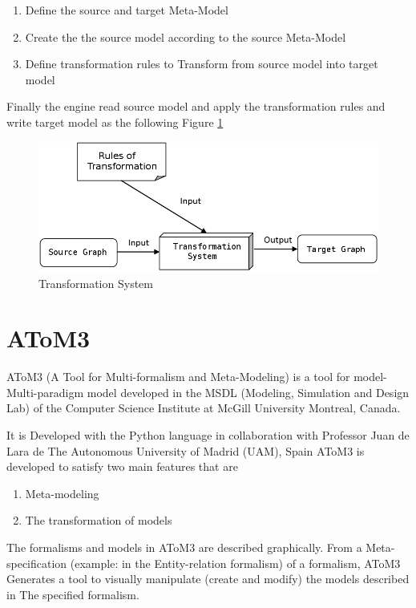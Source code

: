 \begin{enumerate}
\item Define the source and target Meta-Model 
\item Create the the source model according to the source Meta-Model 
\item Define transformation rules to Transform from source model into target model 
\end{enumerate} 
Finally the engine read source model and apply the transformation rules and write target model as the following Figure \ref{fig:Transformation System}
 
\begin{figure}[th]
	\centering
		\includegraphics[scale=0.4]{ch3/img/systemTran}
	\caption{\label{fig:Transformation System}Transformation System\cite{ch3-img}}
\end{figure} 

\section{AToM3}

AToM3 (A Tool for Multi-formalism and Meta-Modeling) is a tool for model-
Multi-paradigm model developed in the MSDL (Modeling, Simulation and
Design Lab) of the Computer Science Institute at McGill University Montreal, Canada\cite{Siteatom, ch3-atom3}.

It is Developed with the Python language in collaboration with Professor Juan de Lara de
The Autonomous University of Madrid (UAM), Spain 
AToM3 is developed to satisfy two main features that are 
\begin{enumerate}
	\item Meta-modeling 
\item The transformation of models
\end{enumerate}

The formalisms and models in AToM3 are described graphically. 
From a Meta-specification (example: in the Entity-relation formalism) of a formalism, AToM3
Generates a tool to visually manipulate (create and modify) the models described in
The specified formalism.

